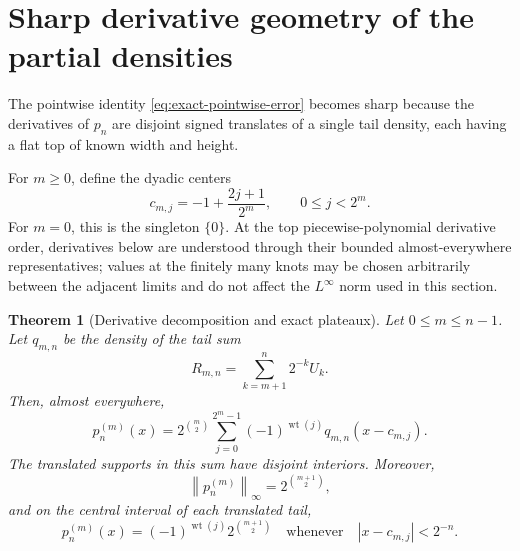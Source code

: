 \documentclass[11pt,oneside]{article}
\newtheorem{theorem}{Theorem}[section]
\theoremstyle{definition}
\theoremstyle{remark}
\newcommand{\wt}{\operatorname{wt}}
\newcommand{\norm}[1]{\left\lVert#1\right\rVert}
\begin{document}
\section{Sharp derivative geometry of the partial densities}
\label{sec:partial-density-geometry}

The pointwise identity \eqref{eq:exact-pointwise-error} becomes sharp because the derivatives
of $p_n$ are disjoint signed translates of a single tail density, each having a flat top of
known width and height.

For $m\ge0$, define the dyadic centers
\begin{equation}
 c_{m,j}=-1+\frac{2j+1}{2^m},
 \qquad 0\le j<2^m.
 \label{eq:cmj-definition}
\end{equation}
For $m=0$, this is the singleton $\{0\}$.  At the top piecewise-polynomial derivative
order, derivatives below are understood through their bounded almost-everywhere
representatives; values at the finitely many knots may be chosen arbitrarily between the
adjacent limits and do not affect the $L^\infty$ norm used in this section.

\begin{theorem}[Derivative decomposition and exact plateaux]
\label{thm:partial-derivative-geometry}
Let $0\le m\le n-1$.  Let $q_{m,n}$ be the density of the tail sum
\begin{equation}
 R_{m,n}=\sum_{k=m+1}^{n}2^{-k}U_k.
 \label{eq:Rmn}
\end{equation}
Then, almost everywhere,
\begin{equation}
 p_n^{(m)}(x)=2^{\binom m2}
 \sum_{j=0}^{2^m-1}(-1)^{\wt(j)}q_{m,n}(x-c_{m,j}).
 \label{eq:pnm-decomposition}
\end{equation}
The translated supports in this sum have disjoint interiors.  Moreover,
\begin{equation}
 \norm{p_n^{(m)}}_\infty=2^{\binom{m+1}{2}},
 \label{eq:pnm-norm}
\end{equation}
and on the central interval of each translated tail,
\begin{equation}
 p_n^{(m)}(x)=(-1)^{\wt(j)}2^{\binom{m+1}{2}}
 \quad\text{whenever}\quad |x-c_{m,j}|<2^{-n}.
 \label{eq:pnm-plateau}
\end{equation}
\end{theorem}
\end{document}
